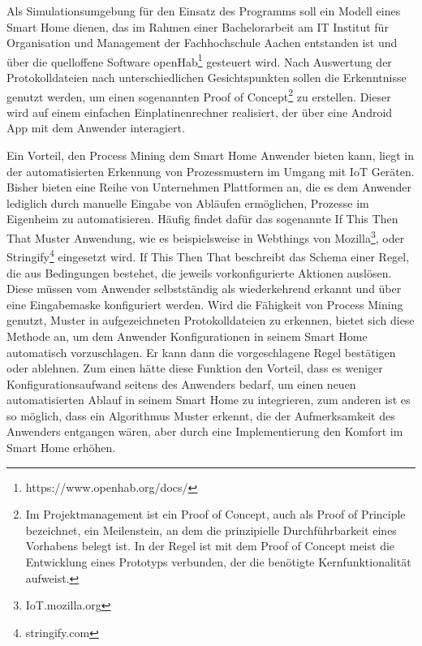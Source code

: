 Als Simulationsumgebung für den Einsatz des Programms soll ein Modell eines Smart Home dienen, das im Rahmen einer Bachelorarbeit am IT Institut für Organisation und Management der Fachhochschule Aachen entstanden ist und über die quelloffene Software openHab\footnote{https://www.openhab.org/docs/} gesteuert wird. Nach Auswertung der Protokolldateien nach unterschiedlichen Gesichtspunkten sollen die Erkenntnisse genutzt werden, um einen sogenannten Proof of Concept\footnote{Im Projektmanagement ist ein Proof of Concept, auch als Proof of Principle bezeichnet, ein Meilenstein, an dem die prinzipielle Durchführbarkeit eines Vorhabens belegt ist. In der Regel ist mit dem Proof of Concept meist die Entwicklung eines Prototyps verbunden, der die benötigte Kernfunktionalität aufweist.\cite{poc}} zu erstellen. Dieser wird auf einem einfachen Einplatinenrechner realisiert, der über eine Android App mit dem Anwender interagiert.

Ein Vorteil, den Process Mining dem Smart Home Anwender bieten kann, liegt in der automatisierten Erkennung von Prozessmustern im Umgang mit IoT Geräten. Bisher bieten eine Reihe von Unternehmen Plattformen an, die es dem Anwender lediglich durch manuelle Eingabe von Abläufen ermöglichen, Prozesse im Eigenheim zu automatisieren. Häufig findet dafür das sogenannte If This Then That Muster Anwendung, wie es beispielsweise in Webthings von Mozilla\footnote{IoT.mozilla.org},  oder Stringify\footnote{stringify.com} eingesetzt wird. 
\newpage
If This Then That beschreibt das Schema einer Regel, die aus Bedingungen bestehet, die jeweils vorkonfigurierte Aktionen auslösen. Diese müssen vom Anwender selbstständig als wiederkehrend erkannt und über eine Eingabemaske konfiguriert werden. Wird die Fähigkeit von Process Mining genutzt, Muster in aufgezeichneten Protokolldateien zu erkennen, bietet sich diese Methode an, um dem Anwender Konfigurationen in seinem Smart Home automatisch vorzuschlagen. Er kann dann die vorgeschlagene Regel bestätigen oder ablehnen. Zum einen hätte diese Funktion den Vorteil, dass es weniger Konfigurationsaufwand seitens des Anwenders bedarf, um einen neuen automatisierten Ablauf in seinem Smart Home zu integrieren, zum anderen ist es so möglich, dass ein Algorithmus Muster erkennt, die der Aufmerksamkeit des Anwenders entgangen wären, aber durch eine Implementierung den Komfort im Smart Home erhöhen.


